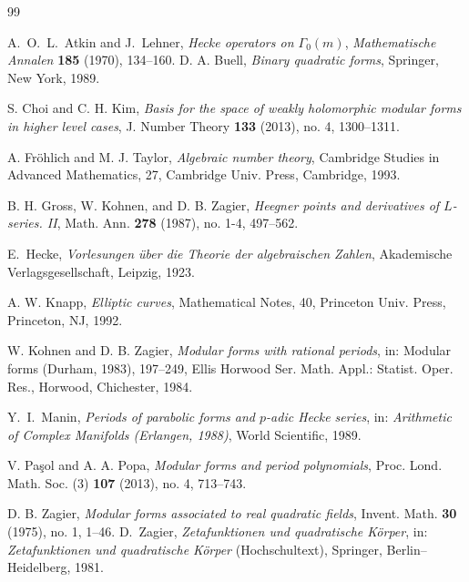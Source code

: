 \documentclass[12pt]{amsart}
\numberwithin{equation}{section}
\theoremstyle{definition}
\begin{document}
\begin{thebibliography}{99}

A.~O.~L.~Atkin and J.~Lehner,
\newblock \emph{Hecke operators on $\Gamma_0(m)$},
\newblock \emph{Mathematische Annalen} \textbf{185} (1970), 134--160.
 D. A. Buell, \textit{Binary quadratic forms}, Springer, New York, 1989.

 S. Choi and C. H. Kim, \textit{Basis for the space of weakly holomorphic modular forms in higher level cases}, J. Number Theory {\bf 133} (2013), no. 4, 1300--1311.

 A. Fr\"{o}hlich and M. J. Taylor, \textit{Algebraic number theory}, Cambridge Studies in Advanced Mathematics, 27, Cambridge Univ. Press, Cambridge, 1993.

 B. H. Gross, W. Kohnen, and D. B. Zagier, \textit{Heegner points and derivatives of $L$-series. II}, Math. Ann. {\bf 278} (1987), no. 1-4, 497--562.

E.~Hecke,
\newblock \emph{Vorlesungen \"uber die Theorie der algebraischen Zahlen},
\newblock Akademische Verlagsgesellschaft, Leipzig, 1923.

 A. W. Knapp, \textit{Elliptic curves}, Mathematical Notes, 40, Princeton Univ. Press, Princeton, NJ, 1992.

 W. Kohnen and D. B. Zagier, \textit{Modular forms with rational periods}, in: Modular forms (Durham, 1983), 197--249, Ellis Horwood Ser. Math. Appl.: Statist. Oper. Res., Horwood, Chichester, 1984.

Y.~I.~Manin,
\newblock \emph{Periods of parabolic forms and $p$-adic Hecke series},
\newblock in: \emph{Arithmetic of Complex Manifolds (Erlangen, 1988)},
World Scientific, 1989.

 V. Pa\c{s}ol and A. A. Popa, \textit{Modular forms and period polynomials}, Proc. Lond. Math. Soc. (3) {\bf 107} (2013), no. 4, 713--743.

 D. B. Zagier, \textit{Modular forms associated to real quadratic fields}, Invent. Math. {\bf 30} (1975), no. 1, 1--46. 
D.~Zagier,
\newblock \emph{Zetafunktionen und quadratische K\"orper},
\newblock in: \emph{Zetafunktionen und quadratische K\"orper} (Hochschultext),
Springer, Berlin--Heidelberg, 1981.
\end{thebibliography}
\end{document}
